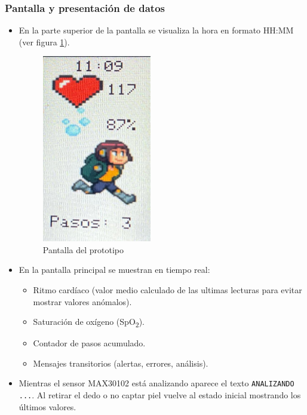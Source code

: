 \documentclass[12pt, a4paper]{article}
\begin{document}
\begin{umaappendices}
	
	\subsubsection{Pantalla y presentación de datos}
	\begin{itemize}
		\item En la parte superior de la pantalla se visualiza la hora en formato HH:MM (ver figura \ref{fig:pantalla}).
		
		\begin{figure}[htbp]
			\centering
			\includegraphics[width=0.45\textwidth]{images/reloj.jpg}
			\caption[Ejemplo]{Pantalla del prototipo}
			\label{fig:pantalla}
		\end{figure}
		
		\item En la pantalla principal se muestran en tiempo real:
		\begin{itemize}
			\item Ritmo cardíaco (valor medio calculado de las ultimas lecturas para evitar mostrar valores anómalos).
			\item Saturación de oxígeno (SpO\textsubscript{2}).
			\item Contador de pasos acumulado.
			\item Mensajes transitorios (alertas, errores, análisis).
		\end{itemize}
		\item Mientras el sensor MAX30102 está analizando aparece el texto \texttt{ANALIZANDO ...}. Al retirar el dedo o no captar piel vuelve al estado inicial mostrando los últimos valores.
	\end{itemize}
	

\end{umaappendices}
\end{document}
